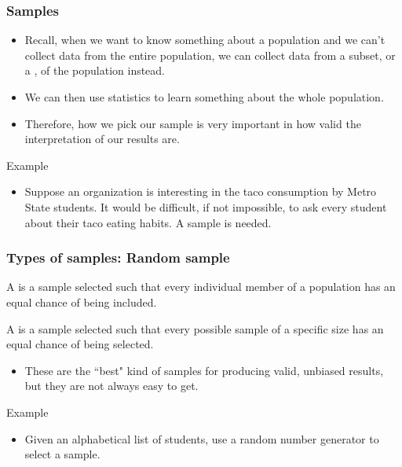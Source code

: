 \documentclass[xcolor=table, handout]{beamer}
\begin{document}
\begin{frame}
\frametitle{Samples}

\begin{block}{}
\begin{itemize}
\item Recall, when we want to know something about a population and we can't collect data from the entire population, we can collect data from a subset, or a , of the population instead.
\pause
\item We can then use statistics to learn something about the whole population.
\pause
\item Therefore, how we pick our sample is very important in how valid the interpretation of our results are.
\end{itemize}
\end{block}
\pause
\begin{exampleblock}{Example}
\begin{itemize}
\item Suppose an organization is interesting in the taco consumption by Metro State students. It would be difficult, if not impossible, to ask every student about their taco eating habits. A sample is needed.
\end{itemize}
\end{exampleblock}
\end{frame}

\begin{frame}
\frametitle{Types of samples: Random sample}

\begin{block}{}
\large A  is a sample selected such that every individual member of a population has an equal chance of being included.
\end{block}
\pause
\begin{block}{}
\large A  is a sample selected such that every possible sample of a specific size has an equal chance of being selected.
\begin{itemize}
\item These are the ``best" kind of samples for producing valid, unbiased results, but they are not always easy to get. 
\end{itemize}
\end{block}
\pause
\begin{exampleblock}{Example}
\begin{itemize}
\item Given an alphabetical list of students, use a random number generator to select a sample.
\end{itemize}
\end{exampleblock}

\end{frame}
\end{document}

